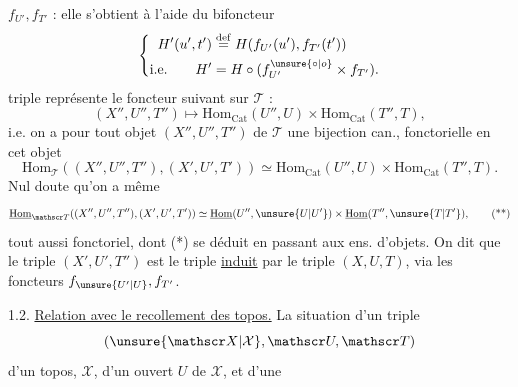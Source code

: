 $f_{U'},f_{T'}$ :
elle s'obtient à l'aide du bifoncteur
\[
\left\{\begin{aligned} H'(u',t')&\overset{\mathrm{def}}{=}H(f_{U'}(u'),f_{T'}(t'))\\ \text{i.e.}\qquad H'&= H\circ(f_{U'}^{\unsure{\circ|o}}\times f_{T'}).\end{aligned}\right.
\]
 triple  représente le foncteur suivant sur $\mathscr T$ :
\[
(X'',U'',T'')\longmapsto\mathrm{Hom}_{\mathrm{Cat}}(U'',U)\times\mathrm{Hom}_{\mathrm{Cat}}(T'',T),
\]
i.e. on a pour tout objet $(X'',U'',T'')$ de $\mathscr T$ une bijection can., fonctorielle en cet objet
\[
\mathrm{Hom}_{\mathscr T}((X'',U'',T''),(X',U',T'))\simeq\mathrm{Hom}_{\mathrm{Cat}}(U'',U)\times\mathrm{Hom}_{\mathrm{Cat}}(T'',T).\tag*{(*)}
\]
Nul doute qu'on a même
\[
\underline{\mathrm{Hom}}_{\mathscr T}((X'',U'',T''),(X',U',T'))\simeq\underline{\mathrm{Hom}}(U'',\unsure{U|U'})\times\underline{\mathrm{Hom}}(T'',\unsure{T|T'}),\tag*{(**)}
\]
tout aussi fonctoriel, dont (*) se déduit en passant aux ens. d'objets. On dit que le triple $(X',U',T'')$  est  le triple \uline{induit} par le triple $(X,U,T)$, via les foncteurs $f_{\unsure{U'|U}},f_{T'}$.

 1.2. \uline{Relation avec le recollement des topos.}
La situation d'un triple 
\[
(\unsure{\mathscr X|\mathcal X},\mathscr U,\mathscr T)
\]
d'un topos, $\mathscr X$, d'un ouvert $U$ de $\mathscr X$, et d'une

